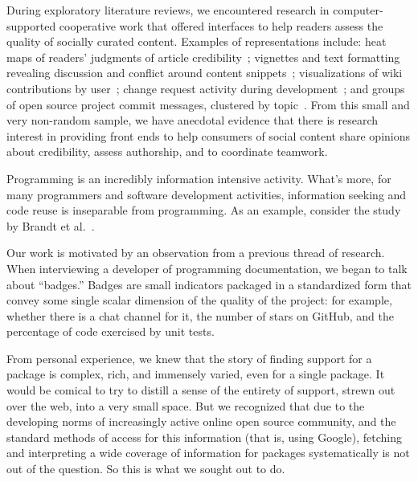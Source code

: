 During exploratory literature reviews, we encountered research in computer-supported cooperative work that offered interfaces to help readers assess the quality of socially curated content.
Examples of representations include: heat maps of readers' judgments of article credibility~\cite{pirolli_so_2009};
vignettes and text formatting revealing discussion and conflict around content snippets~\cite{towne_your_2013,borra_societal_2015};
visualizations of wiki contributions by user~\cite{arazy_recognizing_2010};
change request activity during development~\cite{begel_codebook_2010};
and groups of open source project commit messages, clustered by topic~\cite{hindle_whats_2009}.
From this small and very non-random sample, we have anecdotal evidence that there is research interest in providing front ends to help consumers of social content share opinions about credibility, assess authorship, and to coordinate teamwork.
\fi

Programming is an incredibly information intensive activity.
What's more, for many programmers and software development activities, information seeking and code reuse is inseparable from programming.
As an example, consider the study by Brandt et al.~\cite{brandt_two_2009}.

Our work is motivated by an observation from a previous thread of research.
When interviewing a developer of programming documentation, we began to talk about ``badges.''
Badges are small indicators packaged in a standardized form that convey some single scalar dimension of the quality of the project:
for example, whether there is a chat channel for it, the number of stars on GitHub, and the percentage of code exercised by unit tests.

From personal experience, we knew that the story of finding support for a package is complex, rich, and immensely varied, even for a single package.
It would be comical to try to distill a sense of the entirety of support, strewn out over the web, into a very small space.
But we recognized that due to the developing norms of increasingly active online open source community, and the standard methods of access for this information (that is, using Google), fetching and interpreting a wide coverage of information for packages systematically is not out of the question.
So this is what we sought out to do.

